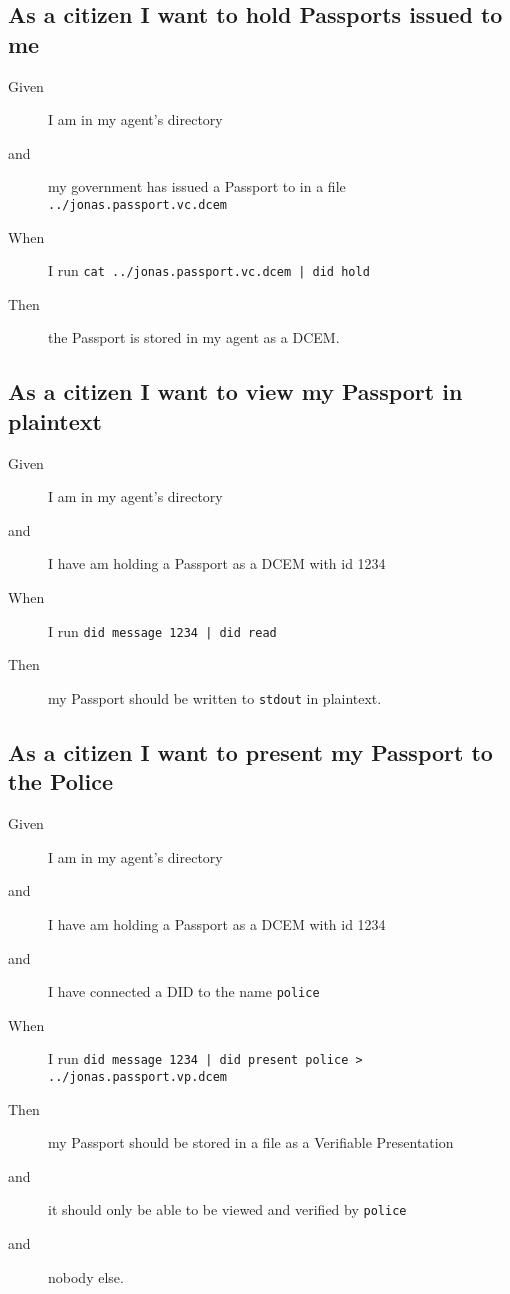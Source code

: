 \subsection{As a citizen I want to hold Passports issued to me}
\begin{description}\begin{description}
    \item[Given] I am in my agent's directory
    \item[and] my government has issued a Passport to in a file \texttt{../jonas.passport.vc.dcem}
    \item[When] I run \texttt{cat ../jonas.passport.vc.dcem | did hold}
    \item[Then] the Passport is stored in my agent as a DCEM.
\end{description}\end{description}



\subsection{As a citizen I want to view my Passport in plaintext}
\begin{description}\begin{description}
    \item[Given] I am in my agent's directory
    \item[and] I have am holding a Passport as a DCEM with id 1234
    \item[When] I run \texttt{did message 1234 | did read}
    \item[Then] my Passport should be written to \texttt{stdout} in plaintext.
\end{description}\end{description}



\subsection{As a citizen I want to present my Passport to the Police}
\begin{description}\begin{description}
    \item[Given] I am in my agent's directory
    \item[and] I have am holding a Passport as a DCEM with id 1234
    \item[and] I have connected a DID to the name \texttt{police}
    \item[When] I run \texttt{did message 1234 | did present police > ../jonas.passport.vp.dcem}
    \item[Then] my Passport should be stored in a file as a Verifiable Presentation
    \item[and] it should only be able to be viewed and verified by \texttt{police}
    \item[and] nobody else.
\end{description}\end{description}



